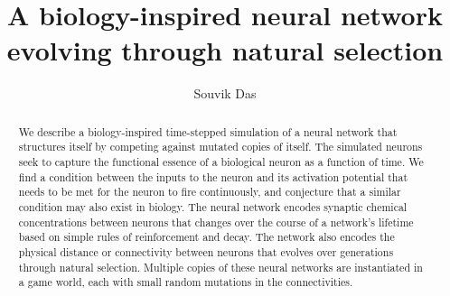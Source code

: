\documentclass[10pt,letterpaper]{article}
\begin{document}
\title{A biology-inspired neural network evolving through natural selection}
\author{Souvik Das}
\maketitle

\begin{abstract}
We describe a biology-inspired time-stepped simulation of a neural network that structures itself by competing against mutated copies of itself. The simulated neurons seek to capture the functional essence of a biological neuron as a function of time. We find a condition between the inputs to the neuron and its activation potential that needs to be met for the neuron to fire continuously, and conjecture that a similar condition may also exist in biology. The neural network encodes synaptic chemical concentrations between neurons that changes over the course of a network's lifetime based on simple rules of reinforcement and decay. The network also encodes the physical distance or connectivity between neurons that evolves over generations through natural selection. Multiple copies of these neural networks are instantiated in a game world, each with small random mutations in the connectivities.



\end{abstract}
\clearpage

\tableofcontents
\clearpage










\end{document}
